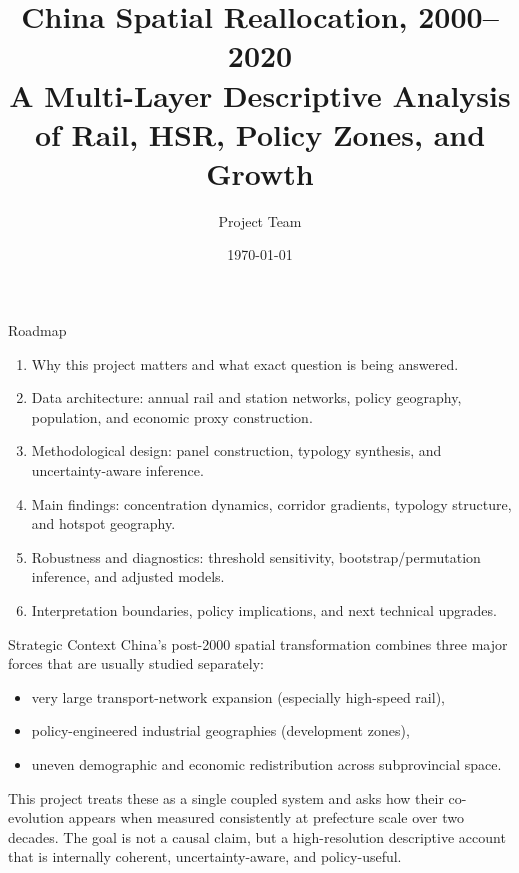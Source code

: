 \documentclass[aspectratio=169]{beamer}
\title[China Spatial Reallocation]{China Spatial Reallocation, 2000--2020\\A Multi-Layer Descriptive Analysis of Rail, HSR, Policy Zones, and Growth}
\author{Project Team}
\institute{Geospatial Final Project}
\date{\today}
\begin{document}
\begin{frame}
  \titlepage
\end{frame}

\begin{frame}{Roadmap}
\small
\begin{enumerate}
  \item Why this project matters and what exact question is being answered.
  \item Data architecture: annual rail and station networks, policy geography, population, and economic proxy construction.
  \item Methodological design: panel construction, typology synthesis, and uncertainty-aware inference.
  \item Main findings: concentration dynamics, corridor gradients, typology structure, and hotspot geography.
  \item Robustness and diagnostics: threshold sensitivity, bootstrap/permutation inference, and adjusted models.
  \item Interpretation boundaries, policy implications, and next technical upgrades.
\end{enumerate}
\end{frame}

\begin{frame}{Strategic Context}
\small
China's post-2000 spatial transformation combines three major forces that are usually studied separately:
\begin{itemize}
  \item very large transport-network expansion (especially high-speed rail),
  \item policy-engineered industrial geographies (development zones),
  \item uneven demographic and economic redistribution across subprovincial space.
\end{itemize}
This project treats these as a single coupled system and asks how their co-evolution appears when measured consistently at prefecture scale over two decades.
\vspace{0.3em}
The goal is not a causal claim, but a high-resolution descriptive account that is internally coherent, uncertainty-aware, and policy-useful.
\end{frame}
\end{document}
